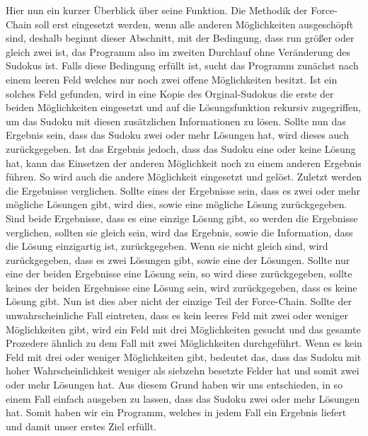 \documentclass[11pt,a4paper]{article}
\begin{document}
Hier nun ein kurzer Überblick über seine Funktion.
Die Methodik der Force-Chain soll erst eingesetzt werden, wenn alle anderen Möglichkeiten ausgeschöpft sind, deshalb beginnt dieser Abschnitt, mit der Bedingung, dass run größer oder gleich zwei ist, das Programm also im zweiten Durchlauf ohne Veränderung des Sudokus ist. Falls diese Bedingung erfüllt ist, sucht das Programm zunächst nach einem leeren Feld welches nur noch zwei offene Möglichkeiten besitzt. Ist ein solches Feld gefunden, wird in eine Kopie des Orginal-Sudokus die erste der beiden Möglichkeiten eingesetzt und auf die Lösungsfunktion rekursiv zugegriffen, um das Sudoku mit diesen zusätzlichen Informationen zu lösen. Sollte nun das Ergebnis sein, dass das Sudoku zwei oder mehr Lösungen hat, wird dieses auch zurückgegeben. Ist das Ergebnis jedoch, dass das Sudoku eine oder keine Lösung hat, kann das Einsetzen der anderen Möglichkeit noch zu einem anderen Ergebnis führen. So wird auch die andere Möglichkeit eingesetzt und gelöst. Zuletzt werden die Ergebnisse verglichen. Sollte eines der Ergebnisse sein, dass es zwei oder mehr mögliche Lösungen gibt, wird dies, sowie eine mögliche Lösung zurückgegeben.
Sind beide Ergebnisse, dass es eine einzige Lösung gibt, so werden die Ergebnisse verglichen, sollten sie gleich sein, wird das Ergebnis, sowie die Information, dass die Lösung einzigartig ist, zurückgegeben. Wenn sie nicht gleich sind, wird zurückgegeben, dass es zwei Lösungen gibt, sowie eine der Lösungen. Sollte nur eine der beiden Ergebnisse eine Lösung sein, so wird diese zurückgegeben, sollte keines der beiden Ergebnisse eine Lösung sein, wird zurückgegeben, dass es keine Lösung gibt. Nun ist dies aber nicht der einzige Teil der Force-Chain.
Sollte der unwahrscheinliche Fall eintreten, dass es kein leeres Feld mit zwei oder weniger Möglichkeiten gibt, wird ein Feld mit drei Möglichkeiten gesucht und das gesamte Prozedere ähnlich zu dem Fall mit zwei Möglichkeiten durchgeführt. Wenn es kein Feld mit drei oder weniger Möglichkeiten gibt, bedeutet das, dass das Sudoku mit hoher Wahrscheinlichkeit weniger als siebzehn besetzte Felder hat und somit zwei oder mehr Lösungen hat. Aus diesem Grund haben wir uns entschieden, in so einem Fall einfach ausgeben zu lassen, dass das Sudoku zwei oder mehr Lösungen hat. Somit haben wir ein Programm, welches in jedem Fall ein Ergebnis liefert und damit unser erstes Ziel erfüllt.

\newpage
\end{document}
